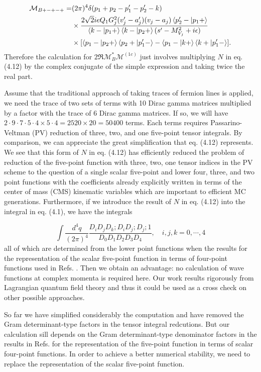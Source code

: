 \begin{align}
\mathcal{M}_{B+-+-+}=&(2\pi)^4\delta(p_1+p_2-p'_1-p'_2-k)\nonumber\\
&\times\frac{2\sqrt{2}ieQ_1G_j^2(v'_j-a'_j)(v_j-a_j)\braket{p'_2-|p_1+}}{\braket{k-|p_1+}\braket{k-|p_2+}(s'-M_{V_j}^2+i\epsilon)}\nonumber\\
&\times[\braket{p_1-|p_2+}\braket{p_2+|p'_1-}-\braket{p_1-|k+}\braket{k+|p'_1-}].\nonumber\\
\end{align}
Therefore the calculation for $2\Re\mathcal{M}_B^\ast\mathcal{M}^(1c)$ just involves multiplying $N$ in eq. (4.12) by the complex conjugate of the simple expression and taking twice the real part.

Assume that the traditional approach of taking traces of fermion lines is applied, we need the trace of two sets of terms with 10 Dirac gamma matrices multiplied by a factor with the trace of 6 Dirac gamma matrices. If so, we will have $2\cdot9\cdot7\cdot5\cdot4\times5\cdot4=2520\times20=50400$ terms. Each terms requires Passarino-Veltman (PV) reduction of three, two, and one five-point tensor integrals. By comparison, we can appreciate the great simplification that eq. (4.12) represents. We see that this form of $N$ in eq. (4.12) has efficiently reduced the problem of reduction of the five-point function with three, two, one tensor indices in the PV scheme to the question of a single scalar five-point and lower four, three, and two point functions with the coefficients already explicitly written in terms of the center of mass (CMS) kinematic variables which are important to efficient MC generations. Furthermore, if we introduce the result of $N$ in eq. (4.12) into the integral in eq. (4.1), we have the integrals

\begin{equation}
\int \frac{d^4q}{(2\pi)^4}\frac{D_iD_jD_k;D_iD_j;D_j;1}{D_0D_1D_2D_3D_4},\quad i,j,k=0,\cdots,4
\end{equation}
all of which are determined from the lower point functions when the results for the representation of the scalar five-point function in terms of four-point functions used in Refs. \cite{tHscarlar,WJ,DD,DD1}. Then we obtain an advantage: no calculation of wave functions at complex momenta is required here. Our work results rigorously from Lagrangian quantum field theory and thus it could be used as a cross check on other possible approaches. 


So far we have simplified considerably the computation and have removed the Gram determinant-type factors in the tensor integral redcutions. But our calculation sill depends on the Gram determinant-type denominator factors in the results in Refs. \cite{tHscarlar,WJ,DD,DD1} for the representation of the five-point function in terms of scalar four-point functions. In order to achieve a better numerical stability, we need to replace the representation of the scalar five-point function.
 
